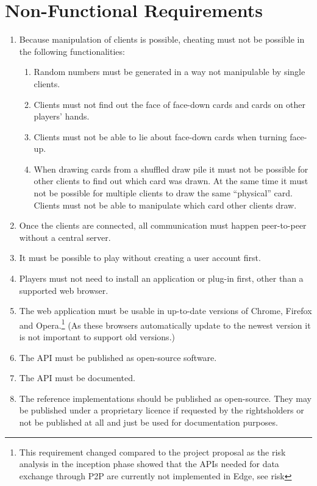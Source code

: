 \section{Non-Functional Requirements} \label{sec:nonfunctionalreq}

\begin{enumerate}
  \item Because manipulation of clients is possible, cheating must not be
  possible in the following functionalities:
  \begin{enumerate}
    \item \label{itm:distributedrandomness} Random numbers must be generated in
    a way not manipulable by single clients.
    \item Clients must not find out the \gls{face} of \gls{face}-down cards and
    cards on other players' \glspl{hand}.
    \item Clients must not be able to lie about \gls{face}-down cards when
    turning \gls{face}-up.
    \item \label{itm:mentalpoker} When drawing cards from a shuffled
    \gls{draw pile} it must not be possible for other clients to find out which
    card was drawn. At the same time it must not be possible for multiple
    clients to draw the same ``physical'' card. Clients must not be able to
    manipulate which card other clients draw.
  \end{enumerate}
  \item Once the clients are connected, all communication must happen
  \gls{peer-to-peer} without a central server.
  \item It must be possible to play without creating a user account first.
  \item Players must not need to install an application or plug-in first, other
  than a supported web browser.
  \item \label{itm:supportedbrowsers} The web application must be usable in
  up-to-date versions of Chrome, Firefox and Opera.\footnote{This requirement
  changed compared to the project proposal as the risk analysis in the
  inception phase showed that the APIs needed for data exchange through
  \gls{P2P} are currently not implemented in Edge, see risk
  } (As these browsers automatically update to the
  newest version it is not important to support old versions.)
  \item The API must be published as open-source software.
  \item The API must be documented.
  \item The reference implementations should be published as open-source. They
  may be published under a proprietary licence if requested by the rightsholders
  or not be published at all and just be used for documentation purposes.
\end{enumerate}

